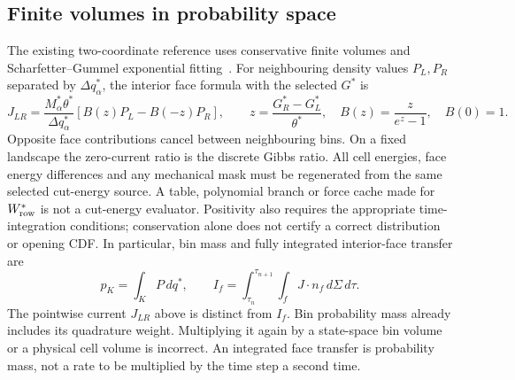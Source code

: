 \documentclass[11pt]{article}
\begin{document}
\subsection{Finite volumes in probability space}
The existing two-coordinate reference uses conservative finite volumes and
Scharfetter--Gummel exponential fitting~\cite{ScharfetterGummel1969}.
For neighbouring density values $P_L,P_R$ separated by $\Delta q_\alpha^*$,
the interior face formula with the selected $G^*$ is
\begin{equation}
 J_{LR}=\frac{M_\alpha^*\theta^*}{\Delta q_\alpha^*}
 \left[B(z)P_L-B(-z)P_R\right],\qquad
 z=\frac{G_R^*-G_L^*}{\theta^*},\quad B(z)=\frac{z}{e^z-1},\quad B(0)=1.
\end{equation}
Opposite face contributions cancel between neighbouring bins. On a fixed
landscape the zero-current ratio is the discrete Gibbs ratio.
All cell energies, face energy differences and any mechanical mask must be
regenerated from the same selected cut-energy source. A table, polynomial
branch or force cache made for $W_{\rm row}^*$ is not a cut-energy evaluator.
Positivity also requires the appropriate time-integration conditions;
conservation alone does not certify a correct distribution or opening CDF.
In particular, bin mass and fully integrated interior-face transfer are
\begin{equation}
 p_K=\int_K P\,dq^*,\qquad
 I_f=\int_{\tau_n}^{\tau_{n+1}}\int_f J\cdot n_f\,d\Sigma\,d\tau.
\end{equation}
The pointwise current $J_{LR}$ above is distinct from $I_f$.
Bin probability mass already includes its quadrature weight. Multiplying it
again by a state-space bin volume or a physical cell volume is incorrect.
An integrated face transfer is probability mass, not a rate to be multiplied
by the time step a second time.

\end{document}
